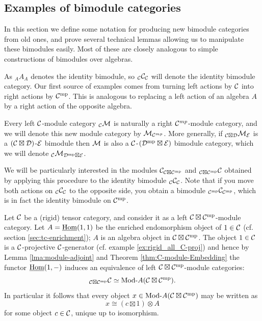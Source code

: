 \documentclass{amsart}
\begin{document}
\subsection{Examples of bimodule categories} \label{sec:examples_of_bimods}

In this section we define some notation for producing new bimodule categories from old ones, and prove several technical lemmas allowing us to manipulate these bimodules easily.  Most of these are closely analogous to simple constructions of bimodules over algebras.

As ${}_A A_A$ denotes the identity bimodule, so ${}_\mathcal C \mathcal C_{\mathcal C}$ will denote the identity bimodule category.  Our first source of examples comes from turning left actions by $\mathcal C$ into right actions by $\mathcal C^{\mathrm{mp}}$.  This is analogous to replacing a left action of an algebra $A$ by a right action of the opposite algebra.

\begin{definition}
Every left $\mathcal C$-module category ${}_\mathcal C \mathcal M$ is naturally a right $\mathcal C^{mp}$-module category, and we will denote this new module category by $\mathcal M_{\mathcal C^{mp}}$.  More generally, if ${}_{\mathcal C \boxtimes \mathcal D} \mathcal M_{\mathcal E}$ is a $(\mathcal C \boxtimes \mathcal D)$-$\mathcal E$ bimodule then $\mathcal M$ is also a $\mathcal C$-$(\mathcal D^{\mathrm{mp}} \boxtimes \mathcal E)$ bimodule category, which we will denote ${}_{\mathcal C}\mathcal M_{\mathcal D^{\mathrm{mp}} \boxtimes \mathcal E}$.
\end{definition}

We will be particularly interested in the modules $\mathcal C_{\mathcal C \boxtimes \mathcal C^{\mathrm{mp}}}$ and ${}_{\mathcal C \boxtimes \mathcal C^{\mathrm{mp}}} \mathcal C$ obtained by applying this procedure to the identity bimodule ${}_\mathcal C \mathcal C_\mathcal C$.  Note that if you move both actions on ${}_\mathcal C \mathcal C_\mathcal C$ to the opposite side, you obtain a bimodule ${}_{\mathcal C^{\mathrm{mp}}}\mathcal C_{\mathcal C^{\mathrm{mp}}}$, which is in fact the identity bimodule on $\mathcal C^{\mathrm{mp}}$.

\begin{example}
	Let $\mathcal C$ be a (rigid) tensor category, and consider it as a left $\mathcal C \boxtimes \mathcal C^{\mathrm{mp}}$-module category. Let $A = \operatorname{\underline{Hom}}(1,1)$ be the enriched endomorphism object of $1 \in \mathcal C$ (cf. section \ref{sec:tc-enrichment}); $A$ is an algebra object in $\mathcal C \boxtimes \mathcal C^{\mathrm{mp}}$. 
The object $1 \in \mathcal C$ is a $\mathcal C$-projective $\mathcal C$-generator (cf. example \ref{ex:rigid_all_C-proj}) and hence by Lemma \ref{lma:module-adjoint} and Theorem \ref{thm:C-module-Embedding} the functor $\operatorname{\underline{Hom}}(1, -)$ induces an 
 equivalence of left $\mathcal C \boxtimes \mathcal C^{\mathrm{mp}}$-module categories:
	\begin{equation*}
		{}_{\cC \boxtimes \cC^\mp} \cC \simeq \Mod{}{A}(\cC \boxtimes \cC^\mp).
	\end{equation*} 
In particular it follows that every object $x \in \Mod{}{A}(\cC \boxtimes \cC^\mp)$ may be written as 
\begin{equation*}
	x \cong (c \boxtimes 1) \otimes A
\end{equation*}
for some object $c \in \mathcal C$, unique up to isomorphism. 
\end{example}
\end{document}
